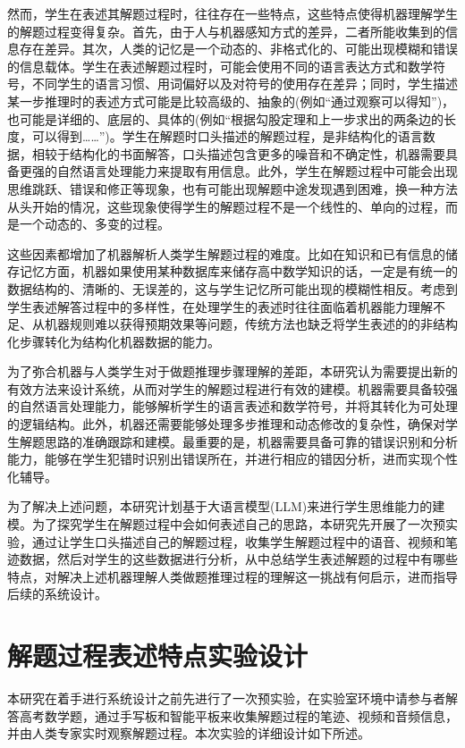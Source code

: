 然而，学生在表述其解题过程时，往往存在一些特点，这些特点使得机器理解学生的解题过程变得复杂。首先，由于人与机器感知方式的差异，二者所能收集到的信息存在差异。其次，人类的记忆是一个动态的、非格式化的、可能出现模糊和错误的信息载体。学生在表述解题过程时，可能会使用不同的语言表达方式和数学符号，不同学生的语言习惯、用词偏好以及对符号的使用存在差异；同时，学生描述某一步推理时的表述方式可能是比较高级的、抽象的(例如“通过观察可以得知”)，也可能是详细的、底层的、具体的(例如“根据勾股定理和上一步求出的两条边的长度，可以得到……”)。学生在解题时口头描述的解题过程，是非结构化的语言数据，相较于结构化的书面解答，口头描述包含更多的噪音和不确定性，机器需要具备更强的自然语言处理能力来提取有用信息。此外，学生在解题过程中可能会出现思维跳跃、错误和修正等现象，也有可能出现解题中途发现遇到困难，换一种方法从头开始的情况，这些现象使得学生的解题过程不是一个线性的、单向的过程，而是一个动态的、多变的过程。

这些因素都增加了机器解析人类学生解题过程的难度。比如在知识和已有信息的储存记忆方面，机器如果使用某种数据库来储存高中数学知识的话，一定是有统一的数据结构的、清晰的、无误差的，这与学生记忆所可能出现的模糊性相反。考虑到学生表述解答过程中的多样性，在处理学生的表述时往往面临着机器能力理解不足、从机器规则难以获得预期效果等问题，传统方法也缺乏将学生表述的的非结构化步骤转化为结构化机器数据的能力。

为了弥合机器与人类学生对于做题推理步骤理解的差距，本研究认为需要提出新的有效方法来设计系统，从而对学生的解题过程进行有效的建模。机器需要具备较强的自然语言处理能力，能够解析学生的语言表述和数学符号，并将其转化为可处理的逻辑结构。此外，机器还需要能够处理多步推理和动态修改的复杂性，确保对学生解题思路的准确跟踪和建模。最重要的是，机器需要具备可靠的错误识别和分析能力，能够在学生犯错时识别出错误所在，并进行相应的错因分析，进而实现个性化辅导。

为了解决上述问题，本研究计划基于大语言模型(LLM)来进行学生思维能力的建模。为了探究学生在解题过程中会如何表述自己的思路，本研究先开展了一次预实验，通过让学生口头描述自己的解题过程，收集学生解题过程中的语音、视频和笔迹数据，然后对学生的这些数据进行分析，从中总结学生表述解题的过程中有哪些特点，对解决上述机器理解人类做题推理过程的理解这一挑战有何启示，进而指导后续的系统设计。

\section{解题过程表述特点实验设计}

本研究在着手进行系统设计之前先进行了一次预实验，在实验室环境中请参与者解答高考数学题，通过手写板和智能平板来收集解题过程的笔迹、视频和音频信息，并由人类专家实时观察解题过程。本次实验的详细设计如下所述。

